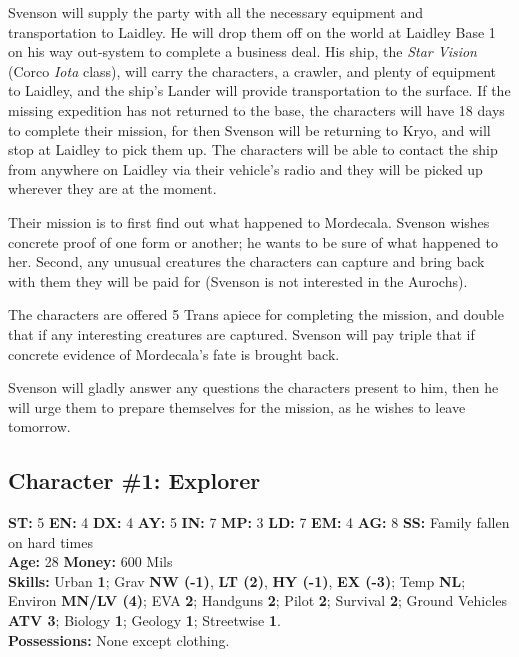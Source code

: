 Svenson will supply the party with all the necessary equipment and
transportation to Laidley. He will drop them off on the world at
Laidley Base 1 on his way out-system to complete a business deal. His
ship, the \emph{Star Vision} (Corco \emph{Iota} class), will carry the
characters, a crawler, and plenty of equipment to Laidley, and the
ship's Lander will provide transportation to the surface. If the
missing expedition has not returned to the base, the characters will
have 18 days to complete their mission, for then Svenson will be
returning to Kryo, and will stop at Laidley to pick them up. The
characters will be able to contact the ship from anywhere on Laidley
via their vehicle's radio and they will be picked up wherever they are
at the moment.

Their mission is to first find out what happened to Mordecala. Svenson
wishes concrete proof of one form or another; he wants to be sure of
what happened to her. Second, any unusual creatures the characters can
capture and bring back with them they will be paid for (Svenson is not
interested in the Aurochs).

The characters are offered 5 Trans apiece for completing the mission,
and double that if any interesting creatures are captured.  Svenson
will pay triple that if concrete evidence of Mordecala's fate is
brought back.

Svenson will gladly answer any questions the characters present to
him, then he will urge them to prepare themselves for the mission, as
he wishes to leave tomorrow.


\subsection{Character \#1: Explorer}
\label{sec:char-1:-expl}

\textbf{ST:} 5 \textbf{EN:} 4 \textbf{DX:} 4 \textbf{AY:} 5
\textbf{IN:} 7 \textbf{MP:} 3 \textbf{LD:} 7 \textbf{EM:} 4
\textbf{AG:} 8 \textbf{SS:} Family fallen on hard times \\
\textbf{Age:} 28 \textbf{Money:} 600 Mils \\
\textbf{Skills:} Urban \textbf{1}; Grav \textbf{NW (-1)}, \textbf{LT
  (2)}, \textbf{HY (-1)}, \textbf{EX (-3)}; Temp \textbf{NL}; Environ
\textbf{MN/LV (4)}; EVA \textbf{2}; Handguns \textbf{2}; Pilot
\textbf{2}; Survival \textbf{2};
Ground Vehicles \textbf{ATV 3}; Biology \textbf{1}; Geology
\textbf{1}; Streetwise \textbf{1}. \\
\textbf{Possessions:} None except clothing.


